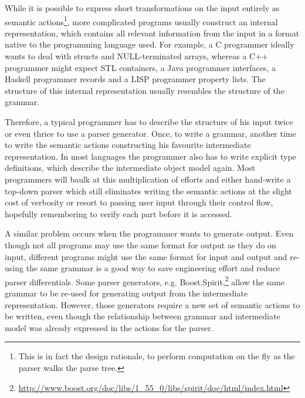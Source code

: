 While it is possible to express short transformations on the input
entirely as semantic actions\footnote{This is in fact the design
rationale, to perform computation on the fly as the parser walks the
parse tree.}, more complicated programs usually construct an internal
representation, which contains all relevant information from the input
in a format native to the programming language used. For example, a C
programmer ideally wants to deal with structs and NULL-terminated arrays,
whereas a C++ programmer might expect STL containers, a Java programmer
interfaces, a Haskell programmer records and a LISP programmer property
lists.  The structure of this internal representation usually resembles
the structure of the grammar.

Therefore, a typical programmer has to describe the structure of his input
twice or even thrice to use a parser generator. Once, to write a grammar,
another time to write the semantic actions constructing his favourite
intermediate representation. In most languages the programmer also
has to write explicit type definitions, which describe the intermediate
object model again. Most programmers will baulk at this multiplication of
efforts and either hand-write a top-down parser which still eliminates
writing the semantic actions at the slight cost of verbosity or resort
to passing user input through their control flow, hopefully remembering
to verify each part before it is accessed.

A similar problem occurs when the programmer wants to generate output.
Even though not all programs may use the same format for output as they
do on input, different programs might use the same format for input and
output and re-using the same grammar is a good way to save engineering
effort and reduce parser differentials.  Some parser generators, e.g.
Boost.Spirit,\footnote{\url{http://www.boost.org/doc/libs/1_55_0/libs/spirit/doc/html/index.html}}
allow the same grammar to be re-used for generating output from the
intermediate representation.  However, those generators require a new set
of semantic actions to be written, even though the relationship between
grammar and intermediate model was already expressed in the actions for
the parser.

